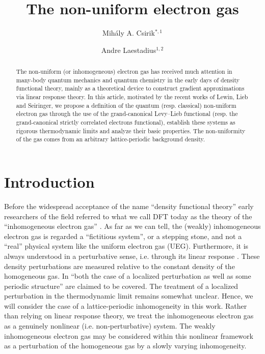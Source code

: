 \documentclass[final,onefignum,onetabnum,reqno]{amsart}
\title[Non-uniform Electron Gas]{The non-uniform electron gas}
\author{Mih\'aly A. Csirik$^{*,1}$
 \and Andre Laestadius$^{1,2}$}
\theoremstyle{remark}
\begin{document}


\begin{abstract}
The non-uniform (or inhomogeneous) electron gas has received much attention in many-body quantum mechanics and quantum chemistry in the early days of density functional theory, mainly as a theoretical device to construct gradient approximations via linear response theory. 
In this article, motivated by the recent works of Lewin, Lieb and Seiringer, we propose a definition of the quantum (resp. classical) non-uniform electron gas through the use of the grand-canonical Levy--Lieb functional (resp. the grand-canonical strictly correlated electrons functional), establish these systems as rigorous thermodynamic limits and analyze their basic properties.
The non-uniformity of the gas comes from an arbitrary lattice-periodic background density.
\end{abstract}

\maketitle


\section{Introduction}

Before the widespread acceptance of the name ``density functional theory'' early researchers of the field referred to what we call DFT today as 
the theory of the ``inhomogeneous electron gas'' \cite{hohenberg1964inhomogeneous,lundqvist1983theory}.
As far as we can tell, the (weakly) inhomogeneous electron gas is regarded a ``fictitious system'', or a stepping stone, and not a ``real'' physical system like the uniform electron gas (UEG).
Furthermore, it is always understood in a perturbative sense, i.e. through its linear response \cite{giuliani2008quantum,engel2011density}. These density perturbations are measured relative to the constant density of the homogeneous gas. In \cite{engel2011density} ``both the case of a localized perturbation as well as some periodic structure'' are claimed to be covered. The treatment of a localized perturbation in the thermodynamic limit remains somewhat unclear. Hence, we will consider the case of a lattice-periodic inhomogeneity in this work.
Rather than relying on linear response theory, we treat the inhomogeneous electron gas as a genuinely nonlinear (i.e. non‑perturbative) system. The weakly inhomogeneous electron gas may be considered within this nonlinear framework as a perturbation of the homogeneous gas by a slowly varying inhomogeneity.
\end{document}
